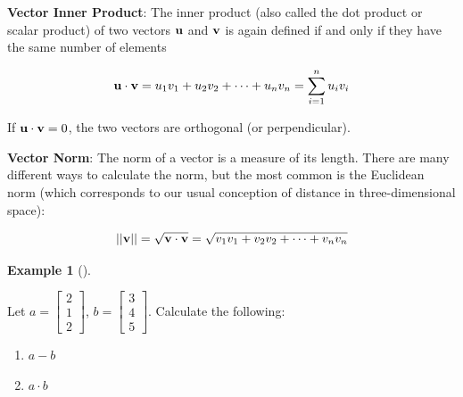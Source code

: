 \documentclass[
  letterpaper,
]{book}
\providecommand{\tightlist}{%
  \setlength{\itemsep}{0pt}\setlength{\parskip}{0pt}}\usepackage{longtable,booktabs,array}
\theoremstyle{definition}
\theoremstyle{definition}
\newtheorem{example}{Example}[chapter]
\theoremstyle{plain}
\theoremstyle{definition}
\theoremstyle{plain}
\theoremstyle{plain}
\theoremstyle{remark}
\begin{document}
\textbf{Vector Inner Product}: The inner product (also called the dot
product or scalar product) of two vectors \({\bf u}\) and \({\bf v}\) is
again defined if and only if they have the same number of elements

\[ {\bf u} \cdot {\bf v} = u_1v_1 + u_2v_2 + \cdots + u_nv_n = \sum_{i = 1}^n u_iv_i\]

If \({\bf u} \cdot {\bf v} = 0\), the two vectors are orthogonal (or
perpendicular).

\textbf{Vector Norm}: The norm of a vector is a measure of its length.
There are many different ways to calculate the norm, but the most common
is the Euclidean norm (which corresponds to our usual conception of
distance in three-dimensional space):

\[ ||{\bf v}|| = \sqrt{{\bf v}\cdot{\bf v}} = \sqrt{ v_1v_1 + v_2v_2 + \cdots + v_nv_n}\]

\leavevmode{}%
\begin{example}[]\label{exm-vectors}

Let \(a = \begin{bmatrix} 2\\1\\2\end{bmatrix}\),
\(b = \begin{bmatrix} 3\\4\\5 \end{bmatrix}\). Calculate the following:

\begin{enumerate}
\def\labelenumi{\arabic{enumi}.}
\tightlist
\item
  \(a - b\)
\item
  \(a \cdot b\)
\end{enumerate}

\end{example}
\end{document}
